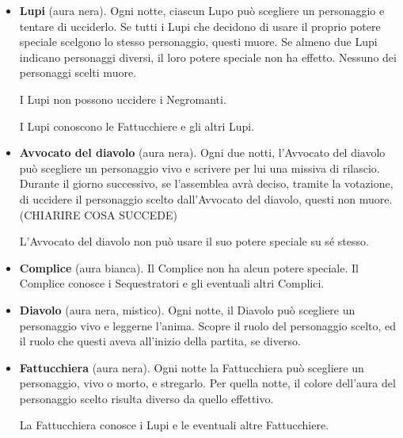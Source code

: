 \documentclass[a4paper,10pt]{article}
\begin{document}
\begin{itemize}
 \item {\bf Lupi} (aura nera). Ogni notte, ciascun Lupo può scegliere un personaggio e tentare di ucciderlo.
 Se tutti i Lupi che decidono di usare il proprio potere speciale scelgono lo stesso personaggio, questi muore.
 Se almeno due Lupi indicano personaggi diversi, il loro potere speciale non ha effetto. Nessuno dei personaggi scelti muore.
 
 I Lupi non possono uccidere i Negromanti.
 
 I Lupi conoscono le Fattucchiere e gli altri Lupi.

 \item {\bf Avvocato del diavolo} (aura nera). Ogni due notti, l'Avvocato del diavolo può scegliere un personaggio vivo e scrivere per lui una missiva di rilascio.
 Durante il giorno successivo, se l'assemblea avrà deciso, tramite la votazione, di uccidere il personaggio scelto dall'Avvocato del diavolo, questi non muore. (CHIARIRE COSA SUCCEDE)
 
 L'Avvocato del diavolo non può usare il suo potere speciale su sé stesso.

 \item {\bf Complice} (aura bianca). Il Complice non ha alcun potere speciale. Il Complice conosce i Sequestratori e gli eventuali altri Complici.

 \item {\bf Diavolo} (aura nera, mistico). Ogni notte, il Diavolo può scegliere un personaggio vivo e leggerne l'anima. Scopre il ruolo del personaggio scelto, ed il ruolo che questi aveva all'inizio della partita, se diverso. %
 
 \item {\bf Fattucchiera} (aura nera). Ogni notte la Fattucchiera può scegliere un personaggio, vivo o morto, e stregarlo. Per quella notte, il colore dell'aura del personaggio scelto risulta diverso da quello effettivo.
 
 La Fattucchiera conosce i Lupi e le eventuali altre Fattucchiere.
 

\end{itemize}
\end{document}
